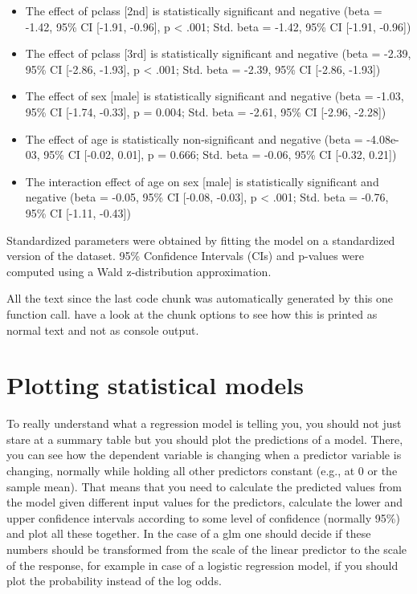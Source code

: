 \documentclass[
  11pt,
  a4paper,
  twoside]{scrbook}
\providecommand{\tightlist}{%
  \setlength{\itemsep}{0pt}\setlength{\parskip}{0pt}}
\begin{document}
\begin{itemize}
\tightlist
\item
  The effect of pclass {[}2nd{]} is statistically significant
  and negative (beta = -1.42, 95\% CI {[}-1.91, -0.96{]}, p \textless{}
  .001; Std. beta = -1.42, 95\% CI {[}-1.91, -0.96{]})
\item
  The effect of pclass {[}3rd{]} is statistically significant
  and negative (beta = -2.39, 95\% CI {[}-2.86, -1.93{]}, p \textless{}
  .001; Std. beta = -2.39, 95\% CI {[}-2.86, -1.93{]})
\item
  The effect of sex {[}male{]} is statistically significant and
  negative (beta = -1.03, 95\% CI {[}-1.74, -0.33{]}, p = 0.004;
  Std. beta = -2.61, 95\% CI {[}-2.96, -2.28{]})
\item
  The effect of age is statistically non-significant and
  negative (beta = -4.08e-03, 95\% CI {[}-0.02, 0.01{]}, p =
  0.666; Std. beta = -0.06, 95\% CI {[}-0.32, 0.21{]})
\item
  The interaction effect of age on sex {[}male{]} is
  statistically significant and negative (beta = -0.05, 95\%
  CI {[}-0.08, -0.03{]}, p \textless{} .001; Std. beta = -0.76, 95\% CI
  {[}-1.11, -0.43{]})
\end{itemize}

Standardized parameters were obtained by fitting the model
on a standardized version of the dataset. 95\% Confidence
Intervals (CIs) and p-values were computed using a Wald
z-distribution approximation.

All the text since the last code chunk was automatically generated by this one function call. have a look at the chunk options to see how this is printed as normal text and not as console output.

\hypertarget{plotting-statistical-models}{%
\section{Plotting statistical models}\label{plotting-statistical-models}}

To really understand what a regression model is telling you, you should not just stare at a summary table but you should plot the predictions of a model. There, you can see how the dependent variable is changing when a predictor variable is changing, normally while holding all other predictors constant (e.g., at \(0\) or the sample mean). That means that you need to calculate the predicted values from the model given different input values for the predictors, calculate the lower and upper confidence intervals according to some level of confidence (normally 95\%) and plot all these together. In the case of a \ac{glm} one should decide if these numbers should be transformed from the scale of the linear predictor to the scale of the response, for example in case of a logistic regression model, if you should plot the probability instead of the log odds.
\end{document}
